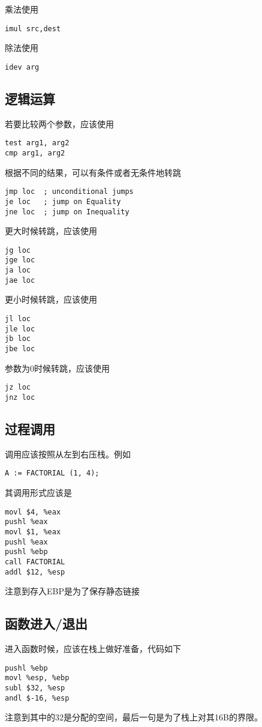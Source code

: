 ﻿\documentclass{article}
\begin{document}
乘法使用
\begin{lstlisting}
imul src,dest
\end{lstlisting}

除法使用
\begin{lstlisting}
idev arg
\end{lstlisting}


\subsection{逻辑运算}

若要比较两个参数，应该使用
\begin{lstlisting}
test arg1, arg2
cmp arg1, arg2
\end{lstlisting}

根据不同的结果，可以有条件或者无条件地转跳
\begin{lstlisting}
jmp loc  ; unconditional jumps
je loc   ; jump on Equality
jne loc  ; jump on Inequality
\end{lstlisting}

更大时候转跳，应该使用
\begin{lstlisting}
jg loc
jge loc
ja loc
jae loc
\end{lstlisting}


更小时候转跳，应该使用
\begin{lstlisting}
jl loc
jle loc
jb loc
jbe loc
\end{lstlisting}

参数为0时候转跳，应该使用
\begin{lstlisting}
jz loc
jnz loc
\end{lstlisting}

\subsection{过程调用}

调用应该按照从左到右压栈。例如
\begin{lstlisting}
A := FACTORIAL (1, 4);
\end{lstlisting}

其调用形式应该是
\begin{lstlisting}
movl $4, %eax
pushl %eax
movl $1, %eax
pushl %eax
pushl %ebp
call FACTORIAL
addl $12, %esp
\end{lstlisting}
注意到存入EBP是为了保存静态链接

\subsection{函数进入/退出}
进入函数时候，应该在栈上做好准备，代码如下
\begin{lstlisting}
pushl %ebp
movl %esp, %ebp
subl $32, %esp
andl $-16, %esp
\end{lstlisting}
注意到其中的32是分配的空间，最后一句是为了栈上对其16B的界限。
\end{document}
